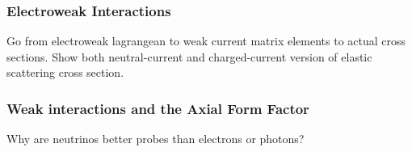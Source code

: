   \subsubsection{Electroweak Interactions}
    Go from electroweak lagrangean to weak current matrix elements to actual
    cross sections. Show both neutral-current and charged-current version of
    elastic scattering cross section.
  \subsubsection{Weak interactions and the Axial Form Factor}
    Why are neutrinos better probes than electrons or photons?

